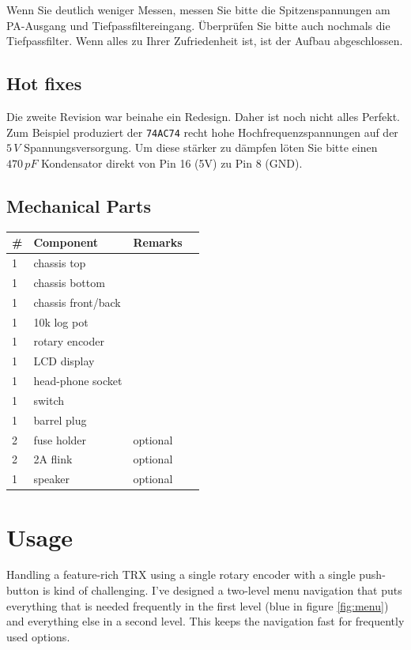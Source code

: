 \documentclass[10pt, a4paper,twoside]{scrartcl}
\begin{document}
Wenn Sie deutlich weniger Messen, messen Sie bitte die Spitzenspannungen am PA-Ausgang und Tiefpassfiltereingang. Überprüfen Sie bitte auch nochmals die Tiefpassfilter. Wenn alles zu Ihrer Zufriedenheit ist, ist der Aufbau abgeschlossen.

\subsection{Hot fixes}
Die zweite Revision war beinahe ein Redesign. Daher ist noch nicht alles Perfekt. Zum Beispiel produziert der \texttt{74AC74} recht hohe Hochfrequenzspannungen auf der $5\,V$ Spannungsversorgung. Um diese stärker zu dämpfen löten Sie bitte einen $470\,pF$ Kondensator direkt von Pin 16 (5V) zu Pin 8 (GND).

\clearpage
\subsection{Mechanical Parts}
\begin{longtable}{|l|p{6cm}|l|l|} \hline 
\# & Component & Remarks \\ \hline 
1 & chassis top & \\
1 & chassis bottom & \\
1 & chassis front/back & \\
1 & 10k log pot & \\
1 & rotary encoder & \\
1 & LCD display & \\
1 & head-phone socket & \\
1 & switch & \\
1 & barrel plug & \\
2 & fuse holder & optional \\
2 & 2A flink & optional \\
1 & speaker & optional \\ \hline
\end{longtable}


\cleardoublepage
\section{Usage} \label{sec:user}
Handling a feature-rich TRX using a single rotary encoder with a single push-button is kind of challenging. I've designed a two-level menu navigation that puts everything that is needed frequently in the first level (blue in figure \ref{fig:menu}) and everything else in a second level. This keeps the navigation fast for frequently used options. 
\end{document}
